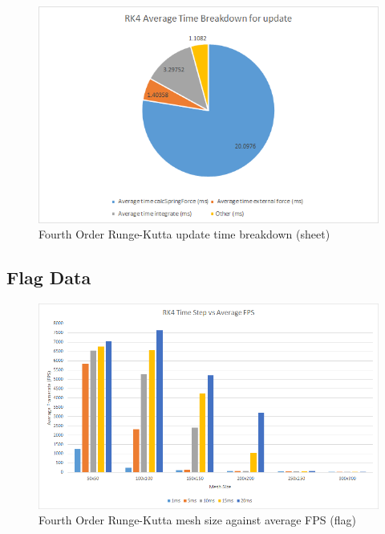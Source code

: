     \begin{figure}
    \begin{center}
      \includegraphics[scale=.9]{Figures/sheet_rk4_ut}
    \end{center}
    \caption{Fourth Order Runge-Kutta update time breakdown (sheet)}
    \label{fig:rk4 ut sheet}
  \end{figure}

\begin{landscape}
\subsection{Flag Data}

    \begin{figure}[!htb]
    \begin{center}
      \includegraphics[scale=0.95]{Figures/flag_rk4_fps}
    \end{center}
    \caption{Fourth Order Runge-Kutta mesh size against average FPS (flag)}
    \label{fig:rk4 fps flag}
  \end{figure}
\end{landscape}
  

